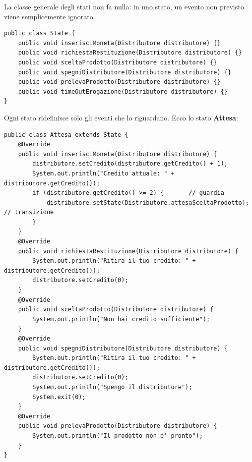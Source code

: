La classe generale degli stati non fa nulla: in uno stato, un evento non previsto viene semplicemente ignorato.

\begin{lstlisting}[style=java]
public class State {
    public void inserisciMoneta(Distributore distributore) {}
    public void richiestaRestituzione(Distributore distributore) {}
    public void sceltaProdotto(Distributore distributore) {}
    public void spegniDistributore(Distributore distributore) {}
    public void prelevaProdotto(Distributore distributore) {}
    public void timeOutErogazione(Distributore distributore) {}
}
\end{lstlisting}

Ogni stato ridefinisce solo gli eventi che lo riguardano. Ecco lo stato \textbf{Attesa}:

\begin{lstlisting}[style=java]
public class Attesa extends State {
    @Override
    public void inserisciMoneta(Distributore distributore) {
        distributore.setCredito(distributore.getCredito() + 1);
        System.out.println("Credito attuale: " + distributore.getCredito());
        if (distributore.getCredito() >= 2) {       // guardia
            distributore.setState(Distributore.attesaSceltaProdotto);  // transizione
        }
    }
    @Override
    public void richiestaRestituzione(Distributore distributore) {
        System.out.println("Ritira il tuo credito: " + distributore.getCredito());
        distributore.setCredito(0);
    }
    @Override
    public void sceltaProdotto(Distributore distributore) {
        System.out.println("Non hai credito sufficiente");
    }
    @Override
    public void spegniDistributore(Distributore distributore) {
        System.out.println("Ritira il tuo credito: " + distributore.getCredito());
        distributore.setCredito(0);
        System.out.println("Spengo il distributore");
        System.exit(0);
    }
    @Override
    public void prelevaProdotto(Distributore distributore) {
        System.out.println("Il prodotto non e' pronto");
    }
}
\end{lstlisting}

